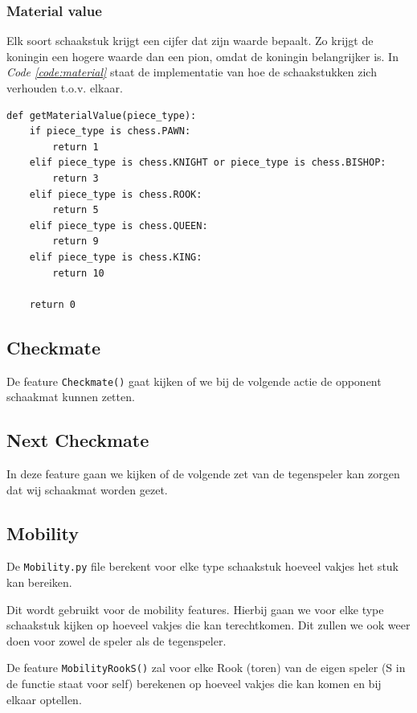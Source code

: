\documentclass[a4paper,openany]{uantwerpenassignment}
\newcommand{\codeword}[1]{
    \colorbox{code}{\texttt{\textcolor{codetext}{#1}}}
}
\newcommand{\coderef}[1]{\textit{Code \ref{#1}}}
\begin{document}
\subsubsection{Material value}
Elk soort schaakstuk krijgt een cijfer dat zijn waarde bepaalt. Zo krijgt de koningin een hogere waarde dan een pion, omdat de koningin belangrijker is. In \coderef{code:material} staat de implementatie van hoe de schaakstukken zich verhouden t.o.v. elkaar.

\begin{lstlisting}[style=mypython,caption={Material Function},captionpos=b,label={code:material}]
def getMaterialValue(piece_type):
    if piece_type is chess.PAWN:
        return 1
    elif piece_type is chess.KNIGHT or piece_type is chess.BISHOP:
        return 3
    elif piece_type is chess.ROOK:
        return 5
    elif piece_type is chess.QUEEN:
        return 9
    elif piece_type is chess.KING:
        return 10

    return 0
\end{lstlisting}

\subsection{Checkmate}

De feature \codeword{Checkmate()} gaat kijken of we bij de volgende actie de opponent schaakmat kunnen zetten.

\subsection{Next Checkmate}

In deze feature gaan we kijken of de volgende zet van de tegenspeler kan zorgen dat wij schaakmat worden gezet.
\pagebreak

\subsection{Mobility}
De \codeword{Mobility.py} file berekent voor elke type schaakstuk hoeveel vakjes het stuk kan bereiken. 

Dit wordt gebruikt voor de mobility features. Hierbij gaan we voor elke type schaakstuk kijken op hoeveel vakjes die kan terechtkomen. Dit zullen we ook weer doen voor zowel de speler als de tegenspeler.

De feature \codeword{MobilityRookS()} zal voor elke Rook (toren) van de eigen speler (S in de functie staat voor self) berekenen op hoeveel vakjes die kan komen en bij elkaar optellen.
\end{document}
